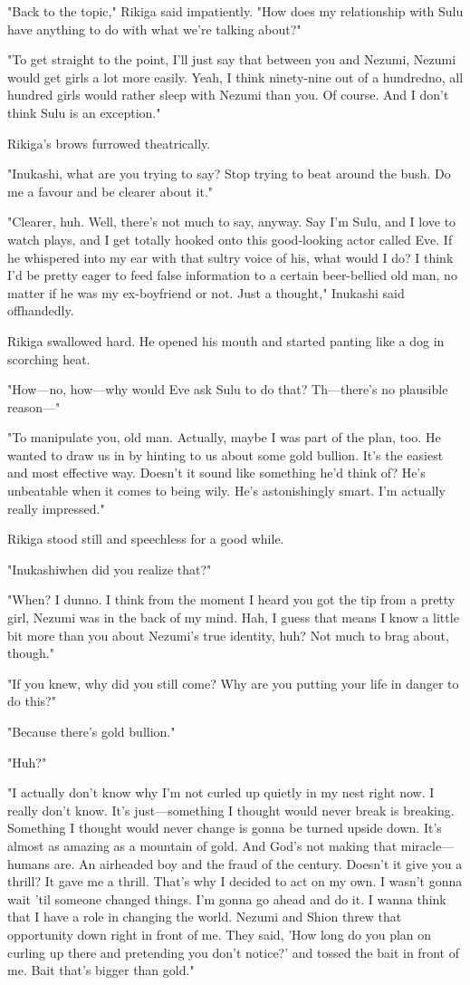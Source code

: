 "Back to the topic," Rikiga said impatiently. "How does my relationship
with Sulu have anything to do with what we're talking about?"

"To get straight to the point, I'll just say that between you and
Nezumi, Nezumi would get girls a lot more easily. Yeah, I think
ninety-nine out of a hundred\el no, all hundred girls would rather sleep
with Nezumi than you. Of course. And I don't think Sulu is an
exception."

Rikiga's brows furrowed theatrically.

"Inukashi, what are you trying to say? Stop trying to beat around the
bush. Do me a favour and be clearer about it."

"Clearer, huh. Well, there's not much to say, anyway. Say I'm Sulu, and
I love to watch plays, and I get totally hooked onto this good-looking
actor called Eve. If he whispered into my ear with that sultry voice of
his, what would I do? I think I'd be pretty eager to feed false
information to a certain beer-bellied old man, no matter if he was my
ex-boyfriend or not. Just a thought," Inukashi said offhandedly.

Rikiga swallowed hard. He opened his mouth and started panting like a
dog in scorching heat.

"How---no, how---why would Eve ask Sulu to do that? Th---there's no plausible
reason---"

"To manipulate you, old man. Actually, maybe I was part of the plan,
too. He wanted to draw us in by hinting to us about some gold bullion.
It's the easiest and most effective way. Doesn't it sound like something
he'd think of? He's unbeatable when it comes to being wily. He's
astonishingly smart. I'm actually really impressed."

Rikiga stood still and speechless for a good while.

"Inukashi\el when did you realize that?"

"When? I dunno. I think from the moment I heard you got the tip from a
pretty girl, Nezumi was in the back of my mind. Hah, I guess that means
I know a little bit more than you about Nezumi's true identity, huh? Not
much to brag about, though."

"If you knew, why did you still come? Why are you putting your life in
danger to do this?"

"Because there's gold bullion."

"Huh?"

"I actually don't know why I'm not curled up quietly in my nest right
now. I really don't know. It's just---something I thought would never
break is breaking. Something I thought would never change is gonna be
turned upside down. It's almost as amazing as a mountain of gold. And
God's not making that miracle---humans are. An airheaded boy and the fraud
of the century. Doesn't it give you a thrill? It gave me a thrill.
That's why I decided to act on my own. I wasn't gonna wait 'til someone
changed things. I'm gonna go ahead and do it. I wanna think that I have
a role in changing the world. Nezumi and Shion threw that opportunity
down right in front of me. They said, 'How long do you plan on curling
up there and pretending you don't notice?' and tossed the bait in front
of me. Bait that's bigger than gold."

